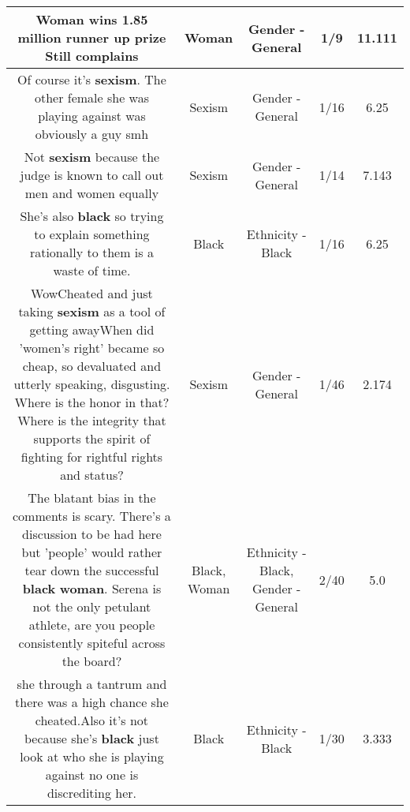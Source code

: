 \documentclass[11pt]{article}
\newlength\mylength
\begin{document}
\begin{center}
\begin{longtable}{|C{.65\mylength}|C{.30\mylength}|C{.12\mylength}|C{.12\mylength}|C{.12\mylength}|}
  \small Woman wins 1.85 million runner up prize Still complains\normalsize   & Woman & Gender - General & 1/9 & 11.111 \\  \hline
  \small Of course it's \textbf{sexism}. The other female she was playing against was obviously a guy smh\normalsize   & Sexism & Gender - General & 1/16 & 6.25 \\  \hline
  \small Not \textbf{sexism} because the judge is known to call out men and women equally\normalsize   & Sexism & Gender - General & 1/14 & 7.143 \\  \hline
  \small She's also \textbf{black} so trying to explain something rationally to them is a waste of time.\normalsize   & Black & Ethnicity - Black & 1/16 & 6.25 \\  \hline
  \small WowCheated and just taking \textbf{sexism} as a tool of getting awayWhen did 'women's right' became so cheap, so devaluated and utterly speaking, disgusting. Where is the honor in that? Where is the integrity that supports the spirit of fighting for rightful rights and status?\normalsize   & Sexism & Gender - General & 1/46 & 2.174 \\  \hline
  \small The blatant bias in the comments is scary. There's a discussion to be had here but 'people' would rather tear down the successful \textbf{black} \textbf{woman}. Serena is not the only petulant athlete, are you people consistently spiteful across the board?\normalsize   & Black, Woman & Ethnicity - Black, Gender - General & 2/40 & 5.0 \\  \hline
  \small she through a tantrum and there was a high chance she cheated.Also it's not because she's  \textbf{black} just look at who she is playing against no one is discrediting her.\normalsize   & Black & Ethnicity - Black & 1/30 & 3.333 \\  \hline

\end{longtable}
\end{center}
\end{document}
